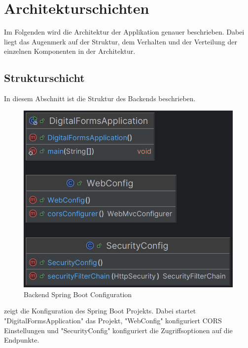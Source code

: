 \chapter{Architekturschichten}\label{ch:arrchitekturschichten}
Im Folgenden wird die Architektur der Applikation genauer beschrieben. Dabei liegt das Augenmerk 
auf der Struktur, dem Verhalten und der Verteilung der einzelnen Komponenten in der Architektur.


\section{Strukturschicht}\label{sec:strukturschicht}

In diesem Abschnitt ist die Struktur des Backends beschrieben.

\begin{figure}[H]
    \centering
    \includegraphics[width=15cm]{images/classDiagrams/Config}
    \caption{Backend Spring Boot Configuration}\label{fig:Backend-Spring-Boot-Configuration}
\end{figure}

 zeigt die Konfiguration des Spring Boot Projekts.
Dabei startet "DigitalFormsApplication" das Projekt, "WebConfig" konfiguriert \ac{CORS} Einstellungen und "SecurityConfig"
konfiguriert die Zugriffsoptionen auf die Endpunkte.

